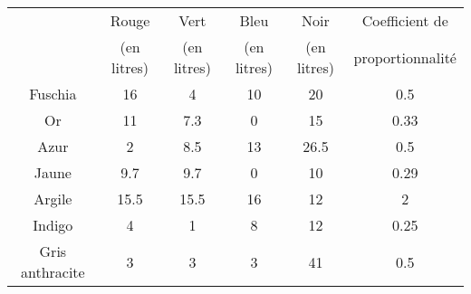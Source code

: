 \documentclass[a4paper,12pt]{article}
\begin{document}
\renewcommand{\arraystretch}{1.5}

\begin{tabular}{|c|c|c|c|c|c|}
	\hline
	                & Rouge       & Vert        & Bleu        & Noir        & Coefficient de   \\
	                & (en litres) & (en litres) & (en litres) & (en litres) & proportionnalité \\ \hline
	Fuschia         & 16          & 4           & 10          & 20          & 0.5              \\ \hline
	Or              & 11          & 7.3         & 0           & 15          & 0.33             \\ \hline
	Azur            & 2           & 8.5         & 13          & 26.5        & 0.5              \\ \hline
	Jaune           & 9.7         & 9.7         & 0           & 10          & 0.29             \\ \hline
	Argile          & 15.5        & 15.5        & 16          & 12          & 2                \\ \hline
	Indigo          & 4           & 1           & 8           & 12          & 0.25             \\ \hline
	Gris anthracite & 3           & 3           & 3           & 41          & 0.5              \\ \hline
\end{tabular}

\renewcommand{\arraystretch}{1}
\end{document}
